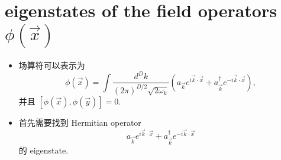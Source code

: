 \documentclass[10pt, a4paper]{article}
\numberwithin{equation}{section}
\begin{document}
	\section{eigenstates of the field operators \texorpdfstring{$\phi(\vec{x})$}{phi(x)}}
	\begin{itemize}
		\item 场算符可以表示为
		\begin{equation}
			\phi(\vec{x}) = \int \frac{d^D k}{(2 \pi)^{D / 2} \sqrt{2 \omega_k}} (a_{\vec{k}} e^{i \vec{k} \cdot \vec{x}} + a^\dag_{\vec{k}} e^{- i \vec{k} \cdot \vec{x}}),
		\end{equation}
		并且 $[\phi(\vec{x}), \phi(\vec{y})] = 0$.
		
		\item 首先需要找到 Hermitian operator
		\begin{equation} \label{B.2}
			a_{\vec{k}} e^{i \vec{k} \cdot \vec{x}} + a^\dag_{\vec{k}} e^{- i \vec{k} \cdot \vec{x}}
		\end{equation}
		的 eigenstate.
		

\end{itemize}
\end{document}
